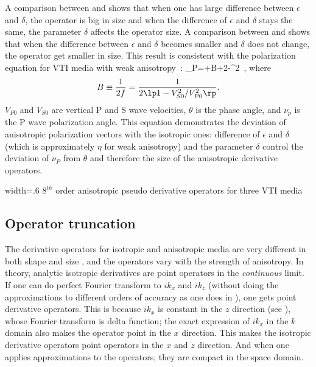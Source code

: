 A comparison between 
and  shows that when one has large
difference between $\epsilon$ and $\delta$, the operator is big in
size and when the difference of $\epsilon$ and $\delta$ stays the
same, the parameter $\delta$ affects the operator size.  A comparison
between  and 
shows that when the difference between $\epsilon$ and $\delta$ becomes
smaller and $\delta$ does not change, the operator get smaller in
size. This result is consistent with the polarization equation for VTI
media with weak anisotropy~\cite[]{Tsvankin}:
\beq
\nu_P=\theta+B\lb\delta+2\lp \epsilon-\delta \rp\sin^2\theta\rb{}\theta \, ,
\eeq
where
\[ B\equiv \frac{1}{2f}=\frac{1}{2\lp1-V_{S0}^2/V_{P0}^2 \rp}.  \]
$V_{P0}$ and $V_{S0}$ are vertical P and S wave velocities, $\theta$
is the phase angle, and $\nu_p$ is the P wave polarization angle. This
equation demonstrates the deviation of anisotropic polarization
vectors with the isotropic ones: difference of $\epsilon$ and $\delta$
(which is approximately $\eta$ for weak anisotropy) and the parameter
$\delta$ control the deviation of $\nu_P$ from $\theta$ and therefore
the size of the anisotropic derivative operators. 

 
{width=.6\textwidth}
{$8^{th}$ order anisotropic pseudo derivative operators for three VTI
  media}




\subsection{Operator truncation}

The derivative operators for isotropic and anisotropic media are very
different in both shape and size {, and the operators vary with
the strength of anisotropy}. In theory, analytic isotropic derivatives
are point operators {in the \emph{continuous} limit}. If one can do
perfect Fourier transform to $ik_x$ and $ik_z$ (without doing the
approximations to different orders of accuracy as one does
in ), one gets point derivative operators. This is because
$ik_x$ is constant in the $z$ direction (see ), whose
Fourier transform is delta function; the exact expression of $ik_x$
in the $k$ domain also makes the operator point in the $x$
direction. This makes the isotropic derivative operators point
operators in the $x$ and $z$ direction. And when one applies
approximations to the operators, they are compact in the space domain.


